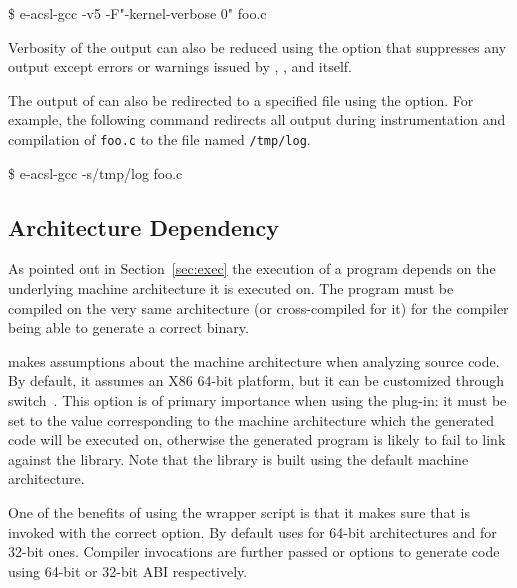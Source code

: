 \begin{frama-c-commands}
\$ e-acsl-gcc -v5 -F"-kernel-verbose 0" foo.c
\end{frama-c-commands}

Verbosity of the \eacslgcc output can also be reduced using the 
option that suppresses any output except errors or warnings issued by \gcc,
\framac, and \eacslgcc itself.

The output of \eacslgcc can also be redirected to a specified file using the
 option.  For example, the following command redirects all
output during instrumentation and compilation of \texttt{foo.c} to the
file named \texttt{/tmp/log}.

\begin{frama-c-commands}
\$ e-acsl-gcc -s/tmp/log foo.c
\end{frama-c-commands}

\subsection{Architecture Dependency}

As pointed out in Section~\ref{sec:exec} the execution of a \C program depends
on the underlying machine architecture it is executed on. The program must be
compiled on the very same architecture (or cross-compiled for it) for the
compiler being able to generate a correct binary.

\framac makes assumptions about the machine architecture when analyzing source
code.  By default, it assumes an X86 64-bit platform, but it can be customized
through  switch~\cite{userman}. This option is of primary
importance when using the \eacsl plug-in: it must be set to the value
corresponding to the machine architecture which the generated code will be
executed on, otherwise the generated program is likely to fail to link against
the \eacsl library.  Note that the library is built using the default
machine architecture.

One of the benefits of using the wrapper script is that it makes sure that
\framac is invoked with the correct  option. By default
\eacslgcc uses  for 64-bit architectures and
 for 32-bit ones. Compiler invocations are
further passed  or  options to generate code using
64-bit or 32-bit ABI respectively.


